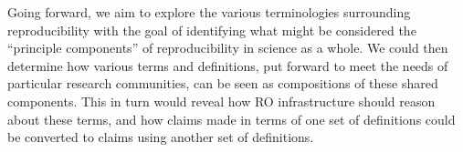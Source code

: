 Going forward, we aim to explore the various terminologies surrounding
    reproducibility with the goal of identifying what might be considered the
    ``principle components'' of reproducibility in science as a whole.
We could then determine how various terms and definitions,
    put forward to meet the needs of particular research communities,
    can be seen as compositions of these shared components.
This in turn would reveal how RO infrastructure should reason about these terms,
	and how claims made in terms of one set of definitions could be converted to
    claims using another set of definitions.



